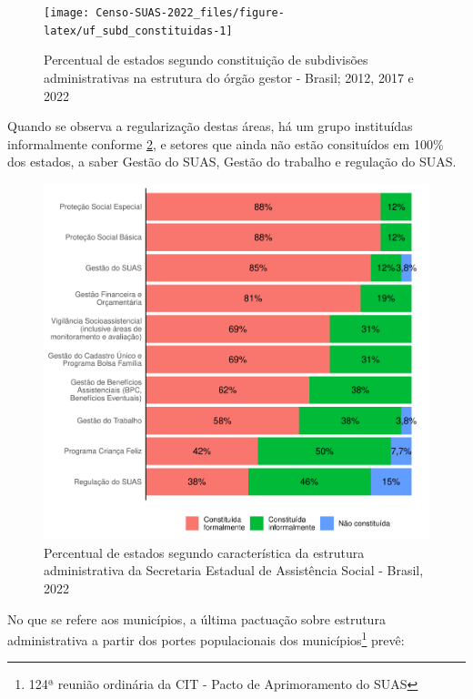 \documentclass[
  brazilian]{report}
\begin{document}
\begin{figure}
\texttt{[image: Censo-SUAS-2022\_files/figure-latex/uf\_subd\_constituidas-1]} \caption[Percentual de estados segundo constituição de subdivisões administrativas na estrutura do órgão gestor - Brasil]{Percentual de estados segundo constituição de subdivisões administrativas na estrutura do órgão gestor - Brasil; 2012, 2017 e 2022}\label{fig:uf_subd_constituidas}
\end{figure}

Quando se observa a regularização destas áreas, há um grupo instituídas
informalmente conforme \cref{fig:estados-constituicao-subdivisoes}, e
setores que ainda não estão consituídos em 100\% dos estados, a saber
Gestão do SUAS, Gestão do trabalho e regulação do SUAS.

\begin{figure}
\includegraphics{Censo-SUAS-2022_files/figure-latex/estados-constituicao-subdivisoes-1} \caption[Percentual de estados segundo característica da estrutura administrativa da Secretaria Estadual de Assistência Social - Brasil,  2022]{Percentual de estados segundo característica da estrutura administrativa da Secretaria Estadual de Assistência Social - Brasil,  2022}\label{fig:estados-constituicao-subdivisoes}
\end{figure}

No que se refere aos municípios, a última pactuação sobre estrutura
administrativa a partir dos portes populacionais dos
municípios\footnote{124ª reunião ordinária da CIT - Pacto de Aprimoramento do SUAS}
prevê:
\end{document}
